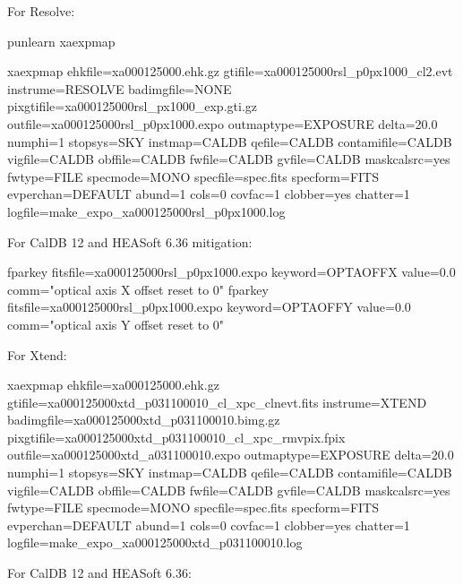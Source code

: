\documentclass[
  letterpaper,
  DIV=11,
  numbers=noendperiod]{scrreprt}
\newenvironment{Shaded}{\begin{snugshade}}{\end{snugshade}}
\newcommand{\ExtensionTok}[1]{\textcolor[rgb]{0.00,0.23,0.31}{#1}}
\newcommand{\NormalTok}[1]{\textcolor[rgb]{0.00,0.23,0.31}{#1}}
\newcommand{\StringTok}[1]{\textcolor[rgb]{0.13,0.47,0.30}{#1}}
\begin{document}
For Resolve:

\begin{Shaded}
\begin{Highlighting}[]
\ExtensionTok{punlearn}\NormalTok{ xaexpmap}

\ExtensionTok{xaexpmap}\NormalTok{ ehkfile=xa000125000.ehk.gz gtifile=xa000125000rsl\_p0px1000\_cl2.evt instrume=RESOLVE badimgfile=NONE pixgtifile=xa000125000rsl\_px1000\_exp.gti.gz outfile=xa000125000rsl\_p0px1000.expo outmaptype=EXPOSURE delta=20.0 numphi=1 stopsys=SKY instmap=CALDB qefile=CALDB contamifile=CALDB vigfile=CALDB obffile=CALDB fwfile=CALDB gvfile=CALDB maskcalsrc=yes fwtype=FILE specmode=MONO specfile=spec.fits specform=FITS evperchan=DEFAULT abund=1 cols=0 covfac=1 clobber=yes chatter=1 logfile=make\_expo\_xa000125000rsl\_p0px1000.log}
\end{Highlighting}
\end{Shaded}

For CalDB 12 and HEASoft 6.36 mitigation:

\begin{Shaded}
\begin{Highlighting}[]
\ExtensionTok{fparkey}\NormalTok{ fitsfile=xa000125000rsl\_p0px1000.expo keyword=OPTAOFFX value=0.0 comm=}\StringTok{"optical axis X offset reset to 0"}
\ExtensionTok{fparkey}\NormalTok{ fitsfile=xa000125000rsl\_p0px1000.expo keyword=OPTAOFFY value=0.0 comm=}\StringTok{"optical axis Y offset reset to 0"}
\end{Highlighting}
\end{Shaded}

For Xtend:

\begin{Shaded}
\begin{Highlighting}[]
\ExtensionTok{xaexpmap}\NormalTok{ ehkfile=xa000125000.ehk.gz gtifile=xa000125000xtd\_p031100010\_cl\_xpc\_clnevt.fits instrume=XTEND badimgfile=xa000125000xtd\_p031100010.bimg.gz pixgtifile=xa000125000xtd\_p031100010\_cl\_xpc\_rmvpix.fpix outfile=xa000125000xtd\_a031100010.expo outmaptype=EXPOSURE delta=20.0 numphi=1 stopsys=SKY instmap=CALDB qefile=CALDB contamifile=CALDB vigfile=CALDB obffile=CALDB fwfile=CALDB gvfile=CALDB maskcalsrc=yes fwtype=FILE specmode=MONO specfile=spec.fits specform=FITS evperchan=DEFAULT abund=1 cols=0 covfac=1 clobber=yes chatter=1 logfile=make\_expo\_xa000125000xtd\_p031100010.log}
\end{Highlighting}
\end{Shaded}

For CalDB 12 and HEASoft 6.36:
\end{document}
